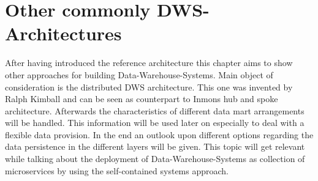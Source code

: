 \section{Other commonly DWS-Architectures}
\label{sec:otherArchitectures}
After having introduced the reference architecture this chapter aims to show other approaches for building Data-Warehouse-Systems. Main object of consideration is the distributed DWS architecture. This one was invented by Ralph Kimball and can be seen as counterpart to Inmons hub and spoke architecture.\newline
Afterwards the characteristics of different data mart arrangements will be handled. This information will be used later on especially to deal with a flexible data provision.\newline
In the end an outlook upon different options regarding the data persistence in the different layers will be given. This topic will get relevant while talking about the deployment of Data-Warehouse-Systems as collection of microservices by using the self-contained systems approach.

